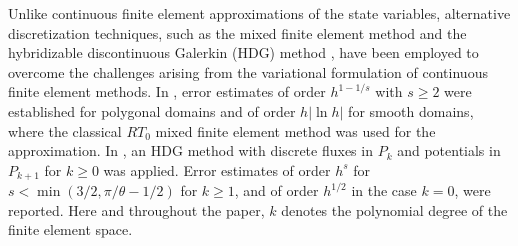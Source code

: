 \documentclass[a4paper,10pt]{article}
\numberwithin{theorem}{section}
\newcommand{\x}[2][blue]{#2}
\begin{document}
Unlike continuous finite element approximations of the state variables, alternative discretization techniques, such as the mixed finite element method \cite{WGong_NYan_2011b} and the hybridizable discontinuous Galerkin (HDG) method \cite{WWHu_JGShen_JRSingler_YWZhang_XBZheng_2020}, have been employed to overcome the challenges arising from the variational formulation of continuous finite element methods. In \cite{WGong_NYan_2011b}, error estimates of order $h^{1-1/s}$ with $s \geq 2$ were established  for polygonal domains and of order $h|\ln h|$ for smooth domains, where the classical $RT_0$ mixed finite element method was used for the approximation. In \cite{WWHu_JGShen_JRSingler_YWZhang_XBZheng_2020}, an HDG method with discrete fluxes in $P_k$ and potentials in $P_{k+1}$ for $k\ge 0$ was applied. Error estimates of order  $h^s$ for $s < \min(3/2, \pi/\theta -1/2)$ for $k\ge 1$, and of order $h^{1/2}$ in the case $k=0$, were reported. \x{Here and throughout the paper, $k$ denotes the polynomial degree of the finite element space.}
\end{document}
